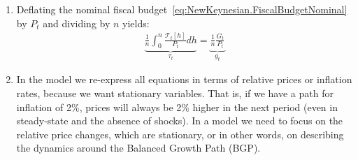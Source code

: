 \begin{enumerate}
\item
Deflating the nominal fiscal budget~\eqref{eq:NewKeynesian.FiscalBudgetNominal} by \(P_{t}\) and dividing by \(n\) yields:
\begin{gather*}
  \underbrace{\frac{1}{n} \int_{0}^{n} \frac{\mathcal{T}_{t}[h]}{P_{t}} dh}_{\tau_{t}}
= \underbrace{\frac{1}{n} \frac{G_{t}}{P_{t}}}_{g_{t}}
\end{gather*}

\item
In the model we re-express all equations in terms of relative prices or inflation rates,
  because we want stationary variables.
That is, if we have a path for inflation of 2\%,
  prices will always be 2\% higher in the next period (even in steady-state and the absence of shocks).
In a model we need to focus on the relative price changes, which are stationary,
  or in other words, on describing the dynamics around the Balanced Growth Path (BGP).


\end{enumerate}
